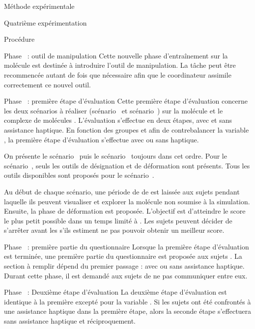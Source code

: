 \documentclass[myfrancais]{mythesis}
\begin{document}
\begin{mychapter}{Méthode expérimentale}
\begin{mysection}{Quatrième expérimentation}
\begin{mysubsection}{Procédure}
\begin{myparagraph}{Phase~ : outil de manipulation}
					Cette nouvelle phase d'entraînement sur la molécule \myTRPZIPPER est destinée à introduire l'outil de manipulation.
					La tâche peut être recommencée autant de fois que nécessaire afin que le coordinateur assimile correctement ce nouvel outil.
				\end{myparagraph}
				\begin{myparagraph}{Phase~ : première étape d'évaluation}
					Cette première étape d'évaluation concerne les deux scénarios à réaliser (scénario~ et scénario~) sur la molécule \myUbiquitin et le complexe de molécules \myNusENusG.
					L'évaluation s'effectue en deux étapes, avec et sans assistance haptique.
					En fonction des groupes et afin de contrebalancer la variable , la première étape d'évaluation s'effectue avec ou sans haptique.

					On présente le scénario~ puis le scénario~ toujours dans cet ordre.
					Pour le scénario~, seuls les outils de désignation et de déformation sont présents.
					Tous les outils disponibles sont proposés pour le scénario~.

					Au début de chaque scénario, une période de  de \mybrainstorming est laissée aux sujets pendant laquelle ils peuvent visualiser et explorer la molécule non soumise à la simulation.
					Ensuite, la phase de déformation est proposée.
					L'objectif est d'atteindre le score  le plus petit possible dans un temps limité à .
					Les sujets peuvent décider de s'arrêter avant les  s'ils estiment ne pas pouvoir obtenir un meilleur score.
				\end{myparagraph}
				\begin{myparagraph}{Phase~ : première partie du questionnaire}
					Lorsque la première étape d'évaluation est terminée, une première partie du questionnaire est proposée aux sujets .
					La section à remplir dépend du premier passage : avec ou sans assistance haptique.
					Durant cette phase, il est demandé aux sujets de ne pas communiquer entre eux.
				\end{myparagraph}
				\begin{myparagraph}{Phase~ : Deuxième étape d'évaluation}
					La deuxième étape d'évaluation est identique à la première excepté pour la variable .
					Si les sujets ont été confrontés à une assistance haptique dans la première étape, alors la seconde étape s'effectuera sans assistance haptique et réciproquement.


\end{myparagraph}
\end{mysubsection}
\end{mysection}
\end{mychapter}
\end{document}
